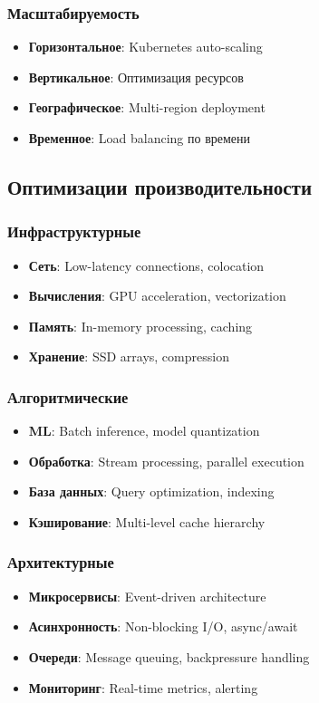 \documentclass[12pt,a4paper]{article}
\begin{document}
\subsubsection{Масштабируемость}
\begin{itemize}
    \item \textbf{Горизонтальное}: Kubernetes auto-scaling
    \item \textbf{Вертикальное}: Оптимизация ресурсов
    \item \textbf{Географическое}: Multi-region deployment
    \item \textbf{Временное}: Load balancing по времени
\end{itemize}

\subsection{Оптимизации производительности}

\subsubsection{Инфраструктурные}
\begin{itemize}
    \item \textbf{Сеть}: Low-latency connections, colocation
    \item \textbf{Вычисления}: GPU acceleration, vectorization
    \item \textbf{Память}: In-memory processing, caching
    \item \textbf{Хранение}: SSD arrays, compression
\end{itemize}

\subsubsection{Алгоритмические}
\begin{itemize}
    \item \textbf{ML}: Batch inference, model quantization
    \item \textbf{Обработка}: Stream processing, parallel execution
    \item \textbf{База данных}: Query optimization, indexing
    \item \textbf{Кэширование}: Multi-level cache hierarchy
\end{itemize}

\subsubsection{Архитектурные}
\begin{itemize}
    \item \textbf{Микросервисы}: Event-driven architecture
    \item \textbf{Асинхронность}: Non-blocking I/O, async/await
    \item \textbf{Очереди}: Message queuing, backpressure handling
    \item \textbf{Мониторинг}: Real-time metrics, alerting
\end{itemize}
\end{document}
